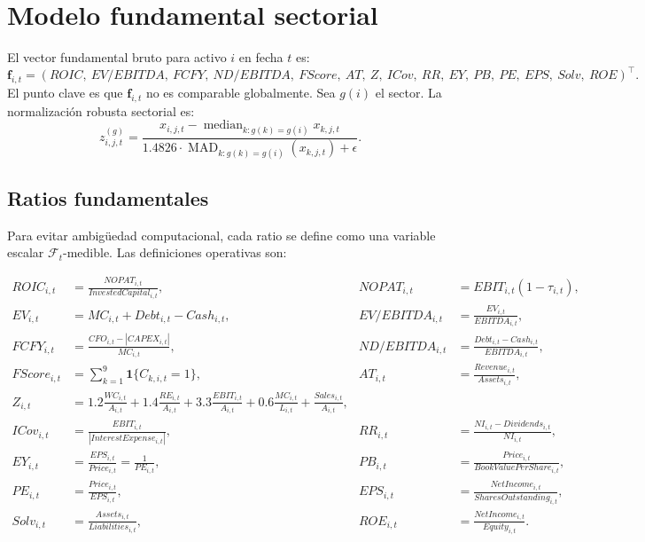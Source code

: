 \documentclass[11pt,letterpaper]{article}
\newcommand{\F}{\mathcal{F}}
\newcommand{\1}{\mathbf{1}}
\begin{document}
\section{Modelo fundamental sectorial}

El vector fundamental bruto para activo \(i\) en fecha \(t\) es:
\[
    \bm f_{i,t}
    =
    (
    ROIC,\ EV/EBITDA,\ FCFY,\ ND/EBITDA,\ FScore,\ AT,\ Z,\ ICov,\ RR,\ EY,\ PB,\ PE,\ EPS,\ Solv,\ ROE
    )^\top.
\]
El punto clave es que \(\bm f_{i,t}\) no es comparable globalmente. Sea \(g(i)\) el sector. La normalización robusta sectorial es:
\[
    z_{i,j,t}^{(g)}
    =
    \frac{x_{i,j,t}-\operatorname{median}_{k:g(k)=g(i)}x_{k,j,t}}
    {1.4826\cdot \operatorname{MAD}_{k:g(k)=g(i)}(x_{k,j,t})+\epsilon}.
\]

\subsection{Ratios fundamentales}

Para evitar ambigüedad computacional, cada ratio se define como una variable escalar
\(\F_t\)-medible. Las definiciones operativas son:

\begin{align}
ROIC_{i,t}
&=
\frac{NOPAT_{i,t}}{InvestedCapital_{i,t}},
&
NOPAT_{i,t}
&=
EBIT_{i,t}(1-\tau_{i,t}),\\
EV_{i,t}
&=
MC_{i,t}+Debt_{i,t}-Cash_{i,t},
&
EV/EBITDA_{i,t}
&=
\frac{EV_{i,t}}{EBITDA_{i,t}},\\
FCFY_{i,t}
&=
\frac{CFO_{i,t}-|CAPEX_{i,t}|}{MC_{i,t}},
&
ND/EBITDA_{i,t}
&=
\frac{Debt_{i,t}-Cash_{i,t}}{EBITDA_{i,t}},\\
FScore_{i,t}
&=
\sum_{k=1}^{9}\1\{C_{k,i,t}=1\},
&
AT_{i,t}
&=
\frac{Revenue_{i,t}}{Assets_{i,t}},\\
Z_{i,t}
&=
1.2\frac{WC_{i,t}}{A_{i,t}}
+1.4\frac{RE_{i,t}}{A_{i,t}}
+3.3\frac{EBIT_{i,t}}{A_{i,t}}
+0.6\frac{MC_{i,t}}{L_{i,t}}
+\frac{Sales_{i,t}}{A_{i,t}},\\
ICov_{i,t}
&=
\frac{EBIT_{i,t}}{|InterestExpense_{i,t}|},
&
RR_{i,t}
&=
\frac{NI_{i,t}-Dividends_{i,t}}{NI_{i,t}},\\
EY_{i,t}
&=
\frac{EPS_{i,t}}{Price_{i,t}}
=
\frac{1}{PE_{i,t}},
&
PB_{i,t}
&=
\frac{Price_{i,t}}{BookValuePerShare_{i,t}},\\
PE_{i,t}
&=
\frac{Price_{i,t}}{EPS_{i,t}},
&
EPS_{i,t}
&=
\frac{NetIncome_{i,t}}{SharesOutstanding_{i,t}},\\
Solv_{i,t}
&=
\frac{Assets_{i,t}}{Liabilities_{i,t}},
&
ROE_{i,t}
&=
\frac{NetIncome_{i,t}}{Equity_{i,t}}.
\end{align}
\end{document}
